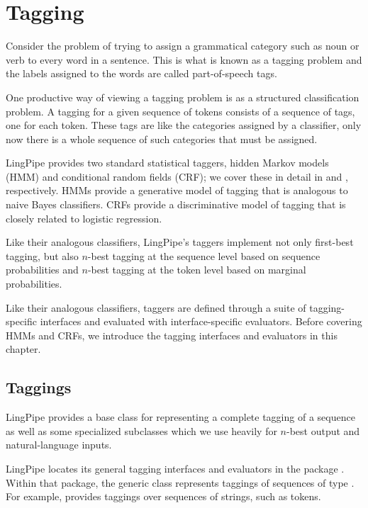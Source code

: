 \chapter{Tagging}\label{chap:tagging}

Consider the problem of trying to assign a grammatical category such
as noun or verb to every word in a sentence.  This is what is known as
a tagging problem and the labels assigned to the words are called
part-of-speech tags.  

One productive way of viewing a tagging problem is as a structured
classification problem.  A tagging for a given sequence of tokens
consists of a sequence of tags, one for each token.  These tags are
like the categories assigned by a classifier, only now there is a
whole sequence of such categories that must be assigned.

LingPipe provides two standard statistical taggers, hidden Markov
models (HMM) and conditional random fields (CRF); we cover these in
detail in  and , respectively.  HMMs provide
a generative model of tagging that is analogous to naive Bayes
classifiers.  CRFs provide a discriminative model of tagging that is
closely related to logistic regression.  

Like their analogous classifiers, LingPipe's taggers implement
not only first-best tagging, but also $n$-best tagging at the
sequence level based on sequence probabilities and $n$-best
tagging at the token level based on marginal probabilities.

Like their analogous classifiers, taggers are defined through
a suite of tagging-specific interfaces and evaluated with
interface-specific evaluators.  Before covering HMMs and CRFs,
we introduce the tagging interfaces and evaluators in this
chapter.


\section{Taggings}

LingPipe provides a base class for representing a complete tagging
of a sequence as well as some specialized subclasses which we use
heavily for $n$-best output and natural-language inputs.

LingPipe locates its general tagging interfaces and evaluators in the
package .  Within that package, the generic class
 represents taggings of sequences of type .
For example,  provides taggings over sequences
of strings, such as tokens.  

